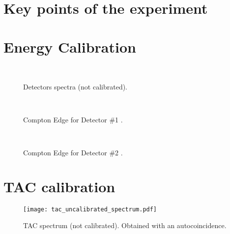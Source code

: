 \documentclass[a4paper,11pt]{article}
\begin{document}

\section*{Key points of the experiment}


\section*{Energy Calibration}


\begin{figure}[h!]
\centering
{} \quad
{} \\
\caption{Detectors spectra (not calibrated).}
\end{figure}

\begin{figure}[h!]
\centering
{} \quad
{} \\
\caption{Compton Edge for Detector \#1 .}
\end{figure}

\begin{figure}[h!]
\centering
{} \quad
{} \\
\caption{Compton Edge for Detector \#2 .}
\end{figure}

\clearpage
\section*{TAC calibration}

\begin{figure}[h!]
\centering
\texttt{[image: tac\_uncalibrated\_spectrum.pdf]}
\caption{TAC spectrum (not calibrated). Obtained with an autocoincidence.}
\end{figure}
\end{document}
